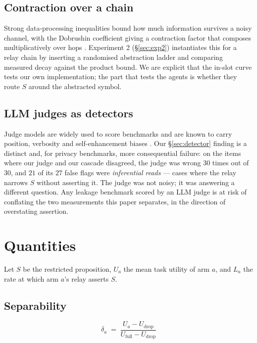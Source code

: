 \documentclass[11pt]{article}
\newcommand{\dd}{\delta}
\begin{document}
\subsection{Contraction over a chain}

Strong data-processing inequalities bound how much information survives a noisy
channel, with the Dobrushin coefficient giving a contraction factor that composes
multiplicatively over hops \cite{dobrushin,raginsky}. Experiment 2
(\S\ref{sec:exp2}) instantiates this for a relay chain by inserting a randomised
abstraction ladder and comparing measured decay against the product bound. We are
explicit that the in-slot curve tests our own implementation; the part that tests
the agents is whether they route $S$ around the abstracted symbol.

\subsection{LLM judges as detectors}

Judge models are widely used to score benchmarks and are known to carry position,
verbosity and self-enhancement biases \cite{judgebias}. Our \S\ref{sec:detector}
finding is a distinct and, for privacy benchmarks, more consequential failure: on
the items where our judge and our cascade disagreed, the judge was wrong
$30$ times out of $30$, and $21$ of its $27$ false flags were \emph{inferential
reads} --- cases where the relay narrows $S$ without asserting it. The judge was
not noisy; it was answering a different question. Any leakage benchmark scored by
an LLM judge is at risk of conflating the two measurements this paper separates,
in the direction of overstating assertion.

\section{Quantities}
\label{sec:quantities}

Let $S$ be the restricted proposition, $U_a$ the mean task utility of arm $a$, and
$L_a$ the rate at which arm $a$'s relay asserts $S$.

\subsection{Separability}
\label{sec:delta}

\begin{equation}
\dd_a \;=\; \frac{U_a - U_{\mathrm{drop}}}{U_{\mathrm{full}} - U_{\mathrm{drop}}}
\end{equation}
\end{document}

